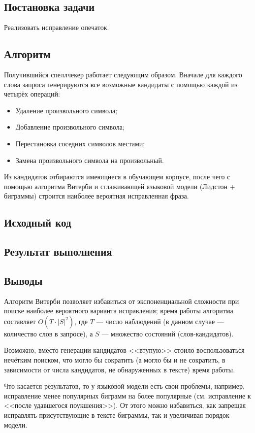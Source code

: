 \documentclass[a4paper, 12pt]{article}
\begin{document}

\newpage


\subsection*{Постановка задачи}
Реализовать исправление опечаток.

\subsection*{Алгоритм}
Получившийся спеллчекер работает следующим образом. Вначале для каждого слова запроса генерируются все возможные кандидаты  с помощью каждой из четырёх операций:

\begin{itemize}
	\item Удаление произвольного символа;
	\item Добавление произвольного символа;
	\item Перестановка соседних символов местами;
	\item Замена произвольного символа на произвольный.
\end{itemize}

Из кандидатов отбираются имеющиеся в обучающем корпусе, после чего с помощью алгоритма Витерби и сглаживающей языковой модели (Лидстон + биграммы) строится наиболее вероятная исправленная фраза.

\subsection*{Исходный код}



\subsection*{Результат выполнения}


\subsection*{Выводы}
Алгоритм Витерби позволяет избавиться от экспоненциальной сложности при поиске наиболее вероятного варианта исправления; время работы алгоритма составляет $O(T \cdot {|S|}^2)$, где $T$ --- число наблюдений (в данном случае --- количество слов в запросе), а $S$ --- множество состояний (слов-кандидатов).

Возможно, вместо генерации кандидатов <<втупую>> стоило воспользоваться нечётким поиском, что могло бы сократить (а могло бы и не сократить, в зависимости от числа кандидатов, не обнаруженных в тексте) время работы.

Что касается результатов, то у языковой модели есть свои проблемы, например, исправление менее популярных биграмм на более популярные (см. исправление к <<после удавшегося поукшения>>). От этого можно избавиться, как запрещая исправлять присутствующие в тексте биграммы, так и увеличивая порядок модели.
\end{document}

